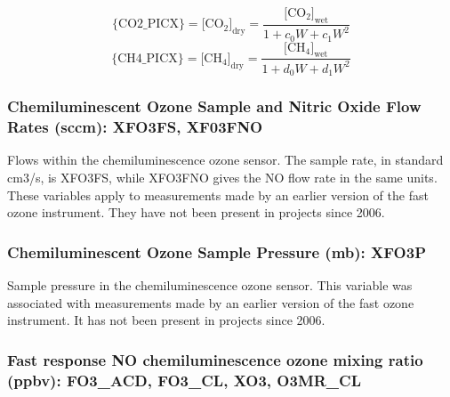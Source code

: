 \documentclass[
  english,
]{book}
\begin{document}
\begin{equation}
\{\mathrm{CO2\_PICX\}}=[\mathrm{CO_{2}]_{dry}=}\frac{[\mathrm{CO_{2}]_{wet}}}{1+c_{0}W+c_{1}W^{2}}
\label{eq:CO2PICbox1}
\end{equation}
\begin{equation}
\{\mathrm{CH4\_PICX\}}=[\mathrm{CH_{4}]_{dry}=}\frac{[\mathrm{CH_{4}]_{wet}}}{1+d_{0}W+d_{1}W^{2}}
\label{eq:CO2PICbox2}
\end{equation}

\hypertarget{xfo3fs}{%
\subsubsection*{Chemiluminescent Ozone Sample and Nitric Oxide Flow Rates (sccm): XFO3FS, XF03FNO}\label{xfo3fs}}

Flows within the chemiluminescence ozone sensor. The sample rate, in standard {cm3/s}, is XFO3FS, while XFO3FNO gives the NO flow rate in the same units. These variables apply to measurements made by an earlier version of the fast ozone instrument. They have not been present in projects since 2006.

\hypertarget{xfo3p}{%
\subsubsection*{Chemiluminescent Ozone Sample Pressure (mb): XFO3P}\label{xfo3p}}

Sample pressure in the chemiluminescence ozone sensor. This variable was associated with
measurements made by an earlier version of the fast ozone instrument. It has not been present in projects since 2006.

\hypertarget{fo3-acd}{%
\subsubsection*{Fast response NO chemiluminescence ozone mixing ratio (ppbv): FO3\_ACD, FO3\_CL, XO3, O3MR\_CL}\label{fo3-acd}}
\end{document}

